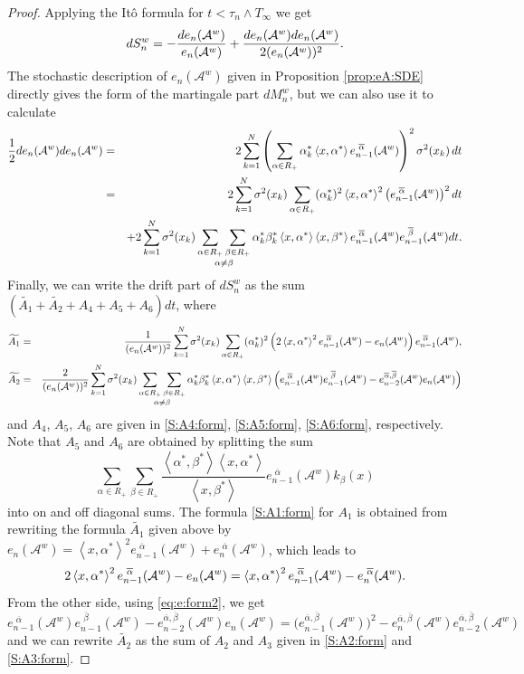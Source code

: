 \documentclass[10pt,a4paper]{amsart}
\newcommand{\Aa}{\mathcal{A}^{w}}
\newcommand{\SaR}{\sum_{\alpha\in R_+}}
\newcommand{\SanbR}{\mathop{\sum_{\aR}\sum_{\bR}}_{\alpha\neq \beta}}
\newcommand{\aR}{\alpha\in R_+}
\newcommand{\abs}{\left<\alpha^*,\beta^*\right>}
\newcommand{\bR}{\beta\in R_+}
\newcommand{\eA}[1]{e_{#1}(\Aa)}
\newcommand{\eaA}[1]{e_{#1}^{\shift\overline{\alpha}}(\Aa)}
\newcommand{\eabA}[1]{e_{#1}^{\overline{\alpha}, \overline{\beta}}(\Aa)}
\newcommand{\ebA}[1]{e_{#1}^{\shift\overline{\beta}}(\Aa)}
\newcommand{\lifetime}{T_\infty}
\newcommand{\shift}{\,\,}
\newcommand{\xas}{\left<x,\alpha^*\right>}
\newcommand{\xbs}{\left<x,\beta^*\right>}
\begin{document}
\begin{proof}
		Applying the It\^o formula for $t<\tau_n\wedge \lifetime
        $ we get
    \begin{equation*}
	dS_n^w = -\frac{d\eA{n}}{\eA{n}}+\dfrac{d\eA{n}d\eA{n}}{2(\eA{n})^2}\/.
    \end{equation*}
		The stochastic description of $\eA{n}$ given in Proposition \ref{prop:eA:SDE} directly gives the form of the martingale part $dM^w_n$, but we can also use it to calculate  
    \begin{eqnarray*}
	\frac12 d\eA{n}d\eA{n} &=& 2\sum_{k=1}^N\left(\sum_{\aR} \alpha_k^* \xas \eaA{n-1}\right)^2\sigma^2(x_k)\,dt\\
	   &=& 2\sum_{k=1}^N \sigma^2(x_k) \SaR (\alpha_k^*)^2 \xas^2 \big(\eaA{n-1}\big)^2\,dt\\
		 && + 2\sum_{k=1}^N \sigma^2(x_k)\SanbR \alpha_k^* \beta_k^* \xas\xbs \eaA{n-1}\ebA{n-1}dt\/.
    \end{eqnarray*} 
    Finally, we can write the drift part of $dS_n^w$ as the sum $(\widetilde{A_1}+\widetilde{A_2}+A_4+A_5+A_6)dt$, where
    \begin{eqnarray*}
        \widetilde{A_1} &=& \frac{1}{(\eA{n})^2}\sum_{k=1}^N \sigma^2(x_k)\SaR (\alpha_k^*)^2  \left(2\xas^2 \eaA{n-1}-\eA{n}\right)\eaA{n-1}\/,\\
	\widetilde{A_2} &=& \frac{2}{(\eA{n})^2}\sum_{k=1}^N \sigma^2(x_k)\SanbR \alpha_k^* \beta_k^* \xas\xbs \left(\eaA{n-1}\ebA{n-1} - \eabA{n-2}\eA{n} \right)
    \end{eqnarray*}
    and $A_4$, $A_5$, $A_6$ are given in \eqref{S:A4:form}, \eqref{S:A5:form}, \eqref{S:A6:form}, respectively. Note that $A_5$ and $A_6$ are obtained by splitting the sum 
		$$
			\sum_{\aR}\sum_{\bR} \frac{\abs\xas}{\xbs} \eaA{n-1}k_\beta(x)
		$$
		into on and off diagonal sums. The formula \eqref{S:A1:form} for $A_1$ is obtained from rewriting the formula $\widetilde{A_1}$ given above by $\eA{n} = \xas^2\eaA{n-1}+\eaA{n}$, which leads to 
    \begin{equation*}
        2\xas^2 \eaA{n-1}-\eA{n} = \xas^2\eaA{n-1}-\eaA{n}\/.
    \end{equation*}
    From the other side, using \eqref{eq:e:form2}, we get
    \begin{equation*}
        \eaA{n-1}\ebA{n-1} - \eabA{n-2}\eA{n} = \big(\eabA{n-1}\big)^2-\eabA{n}\eabA{n-2}
    \end{equation*}
    and we can rewrite $\widetilde{A_2}$ as the sum of $A_2$ and $A_3$ given in \eqref{S:A2:form} and \eqref{S:A3:form}.
\end{proof}
\end{document}
